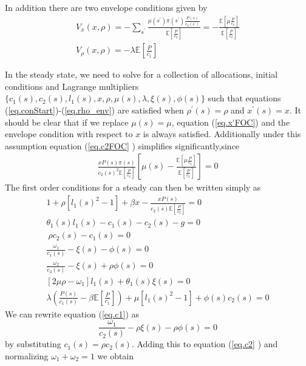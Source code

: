 \documentclass[thmsb,11pt]{article}
\begin{document}
In addition there are two envelope conditions given by
\begin{align}
V_x(x,\rho) = -\sum_{s^{\prime }}\frac{\mu(s^{\prime })\pi(s^{\prime
})\frac{P(s)}{c_2(s^{\prime })}}{\mathbb{E}[\frac{P}{c_2}]} = -\frac{\mathbb{E}%
[\mu\frac{P}{c_2}]}{\mathbb{E}[\frac{P}{c_2}]} \\
V_{\rho}(x,\rho) = -\lambda\mathbb{E}[\frac{P}{c_1}]  \label{eq.rho_env}
\end{align}

In the steady state, we need to solve for a collection of allocations, initial conditions and Lagrange multipliers $%
\{c_1(s),c_2(s),l_1(s),x,\rho,\mu(s),\lambda,\xi(s),\phi(s)\}$ such that
equations (\ref{eq.conStart})-(\ref{eq.rho_env}) are satisfied when $%
\rho^{\prime }(s) = \rho$ and $x^{\prime }(s) = x$. It should be clear that if we replace $\mu(s) = \mu$, equation (\ref{eq.x'FOC})  and the envelope condition with respect to $x$ is
always satisfied. Additionally under this assumption equation (\ref{eq.c2FOC}%
) simplifies significantly,since
\begin{align*}
\frac{xP(s)\pi(s)}{c_2(s)^2\mathbb{E}[\frac{P}{c_2}]}\left[\mu(s)-\frac{\mathbb{E}%
[\mu\frac{P}{c_2}]}{\mathbb{E}[\frac{P}{c_2}]}\right] = 0
\end{align*}
The first order conditions for a
steady can then be written simply as
\begin{align}
1+\rho[l_1(s)^2-1]+\beta x-\frac{x P(s)}{ c_2(s)\mathbb{E}[\frac{P}{c_2}]} = 0
\label{eq.imp} \\
\theta_1(s) l_1(s) - c_1(s)-c_2(s)-g=0  \label{eq.res} \\
\ \rho c_2(s)-c_1(s) = 0  \label{eq.rhoFOC} \\
\frac{\omega_1}{c_1(s)}-\xi(s)-\phi(s) = 0  \label{eq.c1} \\
\frac{\omega_2}{c_2(s)}-\xi(s)+\rho\phi(s) = 0  \label{eq.c2} \\
[2\mu \rho-\omega_1]l_1(s)+\theta_1(s)\xi(s) = 0  \label{eq.l1} \\
\lambda\left(\frac{P(s)}{c_1(s)}-\beta\mathbb{E}\left[\frac{P}{c_1}\right]\right)+\mu[%
l_1(s)^2-1]+\phi(s)c_2(s) = 0  \label{eq.R}
\end{align}
We can rewrite equation (\ref{eq.c1}) as
\begin{equation*}
\frac{\omega_1}{c_2(s)} - \rho\xi(s) -\rho\phi(s) = 0
\end{equation*}%
by substituting $c_1(s) = \rho c_2(s)$. Adding this to equation (\ref{eq.c2}%
) and normalizing $\omega_1+\omega_2 = 1$ we obtain
\end{document}
